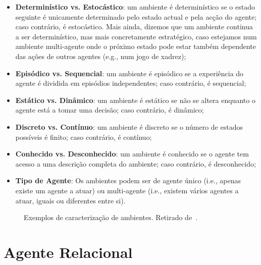 \begin{itemize}
    \item \textbf{Determinístico vs. Estocástico}: um ambiente é determinístico se o estado seguinte é unicamente determinado pelo estado actual e pela acção do agente; caso contrário, é estocástico.
    Mais ainda, dizemos que um ambiente continua a ser determinístico, mas mais concretamente estratégico, caso estejamos num ambiente multi-agente onde o próximo estado pode estar também dependente das ações de outros agentes (e.g., num jogo de xadrez);
    \item \textbf{Episódico vs. Sequencial}: um ambiente é episódico se a experiência do agente é dividida em episódios independentes; caso contrário, é sequencial;
    \item \textbf{Estático vs. Dinâmico}: um ambiente é estático se não se altera enquanto o agente está a tomar uma decisão; caso contrário, é dinâmico;
    \item \textbf{Discreto vs. Contínuo}: um ambiente é discreto se o número de estados possíveis é finito; caso contrário, é contínuo;
    \item \textbf{Conhecido vs. Desconhecido}: um ambiente é conhecido se o agente tem acesso a uma descrição completa do ambiente; caso contrário, é desconhecido;
    \item \textbf{Tipo de Agente}: Os ambientes podem ser de agente único (i.e., apenas existe um agente a atuar) ou multi-agente (i.e., existem vários agentes a atuar, iguais ou diferentes entre si).
\end{itemize}

\begin{figure}[h]
    \begin{center}
    \end{center}
    \caption{Exemplos de caracterização de ambientes.
    Retirado de~\cite{ist:leic:resumos:agentes}.}\label{fig:ambientes-exemplos}
\end{figure}


\section{Agente Relacional}

